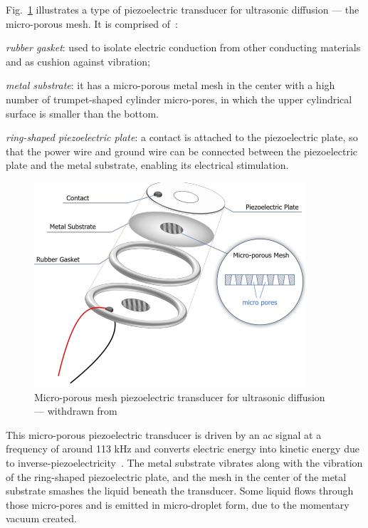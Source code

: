 Fig.~\ref{fig:piezo-transducer} illustrates a type of piezoelectric transducer
for ultrasonic diffusion --- the micro-porous mesh. It is comprised of~\cite{wen2019development}:
\begin{item-c}
\item \emph{rubber gasket}: used to isolate electric conduction from other
  conducting materials and as cushion against vibration;
\item \emph{metal substrate}: it has a micro-porous metal mesh in the center
  with a high number of trumpet-shaped cylinder micro-pores, in which the upper
  cylindrical surface is smaller than the bottom.
\item \emph{ring-shaped piezoelectric plate}: a contact is attached to the
  piezoelectric plate, so that the power wire and ground wire can be connected
  between the piezoelectric plate and the metal substrate, enabling its
  electrical stimulation.
\end{item-c}
%
\begin{figure}[htb!]
\centering
    \includegraphics[width=0.55\columnwidth]{./img/piezo-transducer.png}
  \caption{Micro-porous mesh piezoelectric transducer for ultrasonic diffusion --- withdrawn from~\cite{wen2019development}}%
\label{fig:piezo-transducer}
\end{figure}

This micro-porous piezoelectric transducer is driven by an \gls{ac} signal at a
frequency of around 113 kHz and converts electric energy into kinetic energy due
to inverse-piezoelectricity~\cite{wen2019development}. The metal substrate
vibrates along with the vibration of the ring-shaped piezoelectric plate, and
the mesh in the center of the metal substrate smashes the liquid beneath the
transducer. Some liquid flows through those micro-pores and is emitted in
micro-droplet form, due to the momentary vacuum created.

